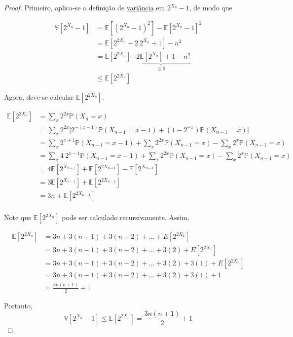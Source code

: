 \begin{proof}
Primeiro, aplica-se a definição de \hyperref[ap:variance]{variância} em $2^{X_n} - 1$, de modo que

\begin{align*}
  \mathbb{V}[2^{X_n} - 1] 
    &= \mathbb{E}[(2^{X_n} - 1) ^ 2] - \mathbb{E}[2^{X_n} - 1]^2  \\
    &= \mathbb{E}[2^{2X_n} -2 \ 2^{X_n} + 1] - n^2 \\
    &= \mathbb{E}[2^{2X_n}] \underbrace{-2 \mathbb{E} [2^{X_n}] + 1 - n^2}_{\leq 0} \\ 
    &\leq \mathbb{E}[2^{2X_n}]
\end{align*}

Agora, deve-se calcular $\mathbb{E}[2^{2X_n}]$.

\begin{align*}
  \mathbb{E}[2^{2X_n}]  
    &=  \sum_{x} 2^{2x} \mathbb{P}(X_n = x) \\
    &=  \sum_{x} 2^{2x} \Big[ 2^{-(x-1)} \mathbb{P}(X_{n-1} = x-1) + (1 - 2^{-x}) \mathbb{P}(X_{n-1} = x) \Big] \\
    &=  \sum_{x} 2^{x+1} \mathbb{P}(X_{n-1} = x-1) + \sum_{x} 2^{2x} \mathbb{P}(X_{n-1} = x) - \sum_{x} 2^{x} \mathbb{P}(X_{n-1} = x) \\
    &=  \sum_{x} 4 \ 2^{x-1} \mathbb{P}(X_{n-1} = x-1) + \sum_{x} 2^{2x} \mathbb{P}(X_{n-1} = x) - \sum_{x} 2^{x} \mathbb{P}(X_{n-1} = x)  \\
    &=  4 \mathbb{E}[2^{X_{n-1}}] + \mathbb{E}[2^{2X_{n-1}}] - \mathbb{E}[2^{X_{n-1}}]  \\
    &=  3 \mathbb{E}[2^{X_{n-1}}] + \mathbb{E}[2^{2X_{n-1}}]  \\
    &=  3 n + \mathbb{E}[2^{2X_{n-1}}]  \\
\end{align*}

Note que $\mathbb{E}[2^{2X_n}]$ pode ser calculado recursivamente. Assim,

\begin{align*}
  \mathbb{E}[2^{2X_{n}}] 
    &= 3n + 3(n-1) + 3(n-2) + \dots + E[2^{2X_2}] \\
    &= 3n + 3(n-1) + 3(n-2) + \dots + 3 (2) + E[2^{2X_1}] \\
    &= 3n + 3(n-1) + 3(n-2) + \dots + 3 (2) + 3 (1) + E[2^{2X_0}] \\
    &= 3n + 3(n-1) + 3(n-2) + \dots + 3 (2) + 3 (1) + 1 \\
    &= \frac{3n(n+1)}{2} + 1
\end{align*}

Portanto, 
\[ \mathbb{V}[2^{X_n} - 1] \leq \mathbb{E}[2^{2X_n}] = \frac{3n(n+1)}{2} + 1 \]

\end{proof}


